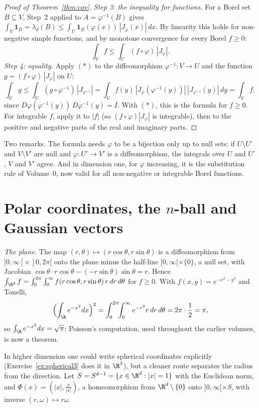 \begin{proof}[Proof of Theorem~\ref{thm:cov}]
\emph{Step 3: the inequality for functions.} For a Borel set $B\subseteq V$, Step~2 applied to $A=\varphi^{-1}(B)$ gives
$\int_V\mathbf 1_B=\lambda_d(B)\le\int_U\mathbf 1_B(\varphi(x))\,|J_\varphi(x)|\,dx$. By linearity this holds for non-negative simple functions, and by monotone convergence for every Borel $f\ge0$:
\[\int_Vf\le\int_U(f\circ\varphi)\,|J_\varphi|.\tag{$*$}\]
\emph{Step 4: equality.} Apply $(*)$ to the diffeomorphism $\varphi^{-1}:V\to U$ and the function $g=(f\circ\varphi)\,|J_\varphi|$ on $U$:
\[\int_Ug\le\int_V(g\circ\varphi^{-1})\,|J_{\varphi^{-1}}|=\int_Vf(y)\,|J_\varphi(\varphi^{-1}(y))|\,|J_{\varphi^{-1}}(y)|\,dy=\int_Vf,\]
since $D\varphi(\varphi^{-1}(y))\,D\varphi^{-1}(y)=I$. With $(*)$, this is the formula for $f\ge0$. For integrable $f$, apply it to $|f|$ (so $(f\circ\varphi)|J_\varphi|$ is integrable), then to the positive and
negative parts of the real and imaginary parts.
\end{proof}

Two remarks. The formula needs $\varphi$ to be a bijection only up to null sets: if $U\setminus U'$ and $V\setminus V'$ are null and $\varphi:U'\to V'$ is a diffeomorphism, the integrals over $U$ and $U'$, $V$ and $V'$
agree. And in dimension one, for $\varphi$ increasing, it is the substitution rule of Volume~0, now valid for all non-negative or integrable Borel functions.

\section{Polar coordinates, the \texorpdfstring{$n$}{n}-ball and Gaussian vectors}

\emph{The plane.} The map $(r,\theta)\mapsto(r\cos\theta,r\sin\theta)$ is a diffeomorphism from $]0,\infty[\times\,]0,2\pi[$ onto the plane minus the half-line $[0,\infty[\times\{0\}$, a null set, with Jacobian
$\cos\theta\cdot r\cos\theta-(-r\sin\theta)\sin\theta=r$. Hence $\int_{\R^2}f=\int_0^{2\pi}\int_0^\infty f(r\cos\theta,r\sin\theta)\,r\,dr\,d\theta$ for $f\ge0$. With $f(x,y)=e^{-x^2-y^2}$ and Tonelli,
\[\Bigl(\int_\R e^{-x^2}dx\Bigr)^2=\int_0^{2\pi}\!\!\int_0^\infty e^{-r^2}r\,dr\,d\theta=2\pi\cdot\frac12=\pi,\]
so $\int_\R e^{-x^2}dx=\sqrt\pi$: Poisson's computation, used throughout the earlier volumes, is now a theorem.

In higher dimension one could write spherical coordinates explicitly (Exercise~\ref{ex:spherical3} does it in $\R^3$), but a cleaner route separates the radius from the direction. Let
$S=S^{d-1}=\{x\in\R^d:|x|=1\}$ with the Euclidean norm, and $\Phi(x)=(|x|,\frac x{|x|})$, a homeomorphism from $\R^d\setminus\{0\}$ onto $]0,\infty[\times S$, with inverse $(r,\omega)\mapsto r\omega$.

